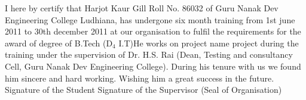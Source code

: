\begin{Large}
\end{Large}
I here by certify that Harjot Kaur Gill Roll No. 86032 of Guru Nanak Dev Engineering College Ludhiana, has undergone six month training from 1st june 2011 to 30th december 2011 at our organisation to fulfil the requirements for the award of degree of B.Tech (D$_4$ I.T)He works on {project name} project during the training under the supervision of Dr. H.S. Rai (Dean, Testing and consultancy Cell, Guru Nanak Dev Engineering College). During his tenure with us we found him sincere and hard working. Wishing him a great success in the future.
\student
Signature of the Student
\supervisor
Signature of the Supervisor 
\stamp
(Seal of Organisation)
\newpage

